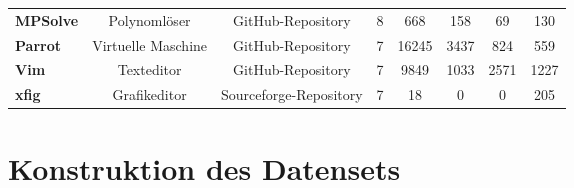 \begin{table}[]
{\begin{tabular}{lccccccc}
\multicolumn{1}{l|}{\textbf{MPSolve}}  & Polynomlöser         & GitHub-Repository      & 8                   & 668                & 158                  & 69                          & 130                 \\
\multicolumn{1}{l|}{\textbf{Parrot}}   & Virtuelle Maschine   & GitHub-Repository      & 7                   & 16245              & 3437                 & 824                         & 559                 \\
\multicolumn{1}{l|}{\textbf{Vim}}      & Texteditor           & GitHub-Repository      & 7                   & 9849               & 1033                 & 2571                        & 1227                \\
\multicolumn{1}{l|}{\textbf{xfig}}     & Grafikeditor         & Sourceforge-Repository & 7                   & 18                 & 0                    & 0                           & 205                
\end{tabular}%
}
\end{table}

\section{Konstruktion des Datensets}

